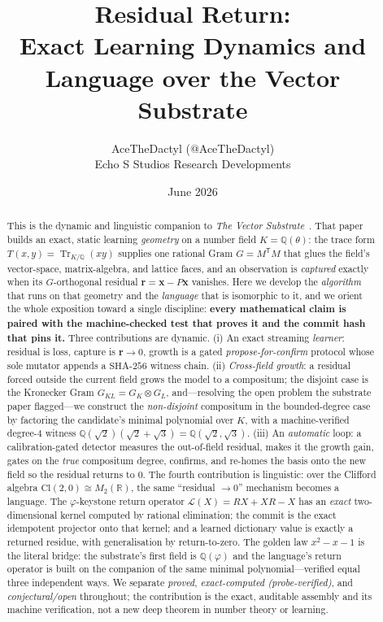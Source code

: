\documentclass[11pt]{article}
\title{\textbf{Residual Return:\\ Exact Learning Dynamics and Language over the Vector Substrate}}
\author{AceTheDactyl (@AceTheDactyl)\\ Echo S Studios Research Developments}
\date{June 2026}
\theoremstyle{plain}
\theoremstyle{definition}
\theoremstyle{remark}
\newcommand{\Q}{\mathbb{Q}}
\newcommand{\R}{\mathbb{R}}
\newcommand{\K}{K}
\newcommand{\Tr}{\operatorname{Tr}}
\newcommand{\rr}{\mathbf{r}}
\newcommand{\xx}{\mathbf{x}}
\newcommand{\GG}{G}
\newcommand{\transpose}{^{\mathsf{T}}}
\newcommand{\Cl}{\mathrm{Cl}}
\newcommand{\Lop}{\mathcal{L}}
\begin{document}
\maketitle

\begin{abstract}
This is the dynamic and linguistic companion to \emph{The Vector Substrate}~\cite{VectorSubstrate}. That
paper builds an exact, static learning \emph{geometry} on a number field $\K=\Q(\theta)$: the trace form
$T(x,y)=\Tr_{\K/\Q}(xy)$ supplies one rational Gram $\GG=M\transpose M$ that glues the field's vector-space,
matrix-algebra, and lattice faces, and an observation is \emph{captured} exactly when its $\GG$-orthogonal
residual $\rr=\xx-P\xx$ vanishes. Here we develop the \emph{algorithm} that runs on that geometry and the
\emph{language} that is isomorphic to it, and we orient the whole exposition toward a single discipline:
\textbf{every mathematical claim is paired with the machine-checked test that proves it and the commit hash
that pins it.} Three contributions are dynamic. (i) An exact streaming \emph{learner}: residual is loss,
capture is $\rr\to0$, growth is a gated \emph{propose-for-confirm} protocol whose sole mutator appends a
$\mathrm{SHA}\text{-}256$ witness chain. (ii) \emph{Cross-field growth}: a residual forced outside the
current field grows the model to a compositum; the disjoint case is the Kronecker Gram
$\GG_{\K L}=\GG_\K\otimes\GG_L$, and---resolving the open problem the substrate paper flagged---we construct
the \emph{non-disjoint} compositum in the bounded-degree case by factoring the candidate's minimal polynomial
over $\K$, with a machine-verified degree-$4$ witness $\Q(\sqrt2)(\sqrt2+\sqrt3)=\Q(\sqrt2,\sqrt3)$. (iii) An
\emph{automatic} loop: a calibration-gated detector measures the out-of-field residual, makes it the growth
gain, gates on the \emph{true} compositum degree, confirms, and re-homes the basis onto the new field so the
residual returns to $0$. The fourth contribution is linguistic: over the Clifford algebra
$\Cl(2,0)\cong M_2(\R)$, the same ``residual $\to 0$'' mechanism becomes a language. The $\varphi$-keystone
return operator $\Lop(X)=RX+XR-X$ has an \emph{exact} two-dimensional kernel computed by rational
elimination; the commit is the exact idempotent projector onto that kernel; and a learned dictionary value is
exactly a returned residue, with generalisation by return-to-zero. The golden law $x^2-x-1$ is the literal
bridge: the substrate's first field is $\Q(\varphi)$ and the language's return operator is built on the
companion of the same minimal polynomial---verified equal three independent ways. We separate \emph{proved},
\emph{exact-computed (probe-verified)}, and \emph{conjectural/open} throughout; the contribution is the exact,
auditable assembly and its machine verification, not a new deep theorem in number theory or learning.
\end{abstract}
\end{document}
